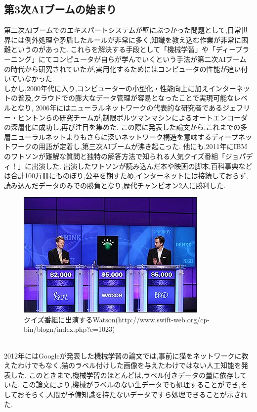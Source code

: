 \subsection{第3次AIブームの始まり}
第二次AIブームでのエキスパートシステムが壁にぶつかった問題として,日常世界には例外処理や矛盾したルールが非常に多く,知識を教え込む作業が非常に困難というのがあった.
これらを解決する手段として「機械学習」や「ディープラーニング」にてコンピュータが自らが学んでいくという手法が第二次AIブームの時代から研究されていたが,実用化するためにはコンピュータの性能が追い付いていなかった.\\
しかし,2000年代に入り,コンピューターの小型化・性能向上に加えインターネットの普及,クラウドでの膨大なデータ管理が容易となったことで実現可能なレベルとなり,
2006年にはニューラルネットワークの代表的な研究者であるジェフリー・ヒントンらの研究チームが,制限ボルツマンマシンによるオートエンコーダの深層化に成功し,再び注目を集めた.
この際に発表した論文から,これまでの多層ニューラルネットよりもさらに深いネットワーク構造を意味するディープネットワークの用語が定着し,第三次AIブームが沸き起こった.
他にも,2011年にIBMのワトソンが難解な質問と独特の解答方法で知られる人気クイズ番組「ジョパディ！」に出演した.\cite{webpage6}
出演したワトソンが読み込んだ本や映画の脚本,百科事典などは合計100万冊にものぼり,公平を期すため,インターネットには接続しておらず,読み込んだデータのみでの勝負となり,歴代チャンピオン2人に勝利した.
\begin{figure}[!ht]
    \begin{screen}
    \begin{center}
        \includegraphics[scale=1.1, clip]{./img/Watson.jpg}
        \caption{クイズ番組に出演するWatson\newline(http://www.swift-web.org/cp-bin/blogn/index.php?e=1023)}
        \label{fig:クイズ番組に出演するWatson}
    \end{center}
\end{screen}
\end{figure}\\
2012年にはGoogleが発表した機械学習の論文では,事前に猫をネットワークに教えたわけでもなく,猫のラベル付けした画像を与えたわけではない人工知能を発表した.\cite{ronbun3}
このときまで,機械学習のほとんどは,ラベル付きデータの量に依存していた.
この論文により,機械がラベルのない生データでも処理することができ,そしておそらく,人間が予備知識を持たないデータですら処理できることが示された.
